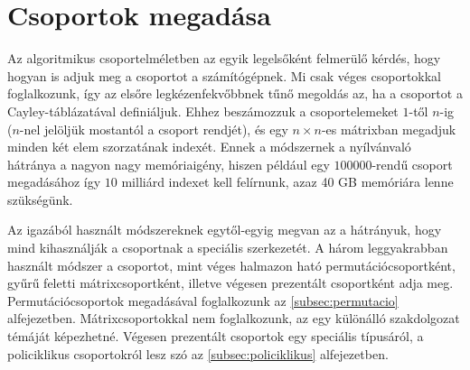 \section{Csoportok megadása}
\label{sec:csoport}
Az algoritmikus csoportelméletben az egyik legelsőként felmerülő kérdés, hogy hogyan is adjuk meg a csoportot a számítógépnek.
Mi csak véges csoportokkal foglalkozunk, így az elsőre legkézenfekvőbbnek tűnő megoldás az, ha a csoportot a Cayley-táblázatával definiáljuk.
Ehhez beszámozzuk a csoportelemeket $1$-től $n$-ig ($n$-nel jelöljük mostantól a csoport rendjét),
és egy $n\times n$-es mátrixban megadjuk minden két elem szorzatának indexét.
Ennek a módszernek a nyílvánvaló hátránya a nagyon nagy memóriaigény,
hiszen például egy $100000$-rendű csoport megadásához így $10$ milliárd indexet kell felírnunk, azaz 40 GB memóriára lenne szükségünk.

Az igazából használt módszereknek egytől-egyig megvan az a hátrányuk, hogy mind kihasználják a csoportnak a speciális szerkezetét.
A három leggyakrabban használt módszer a csoportot, mint véges halmazon ható permutációcsoportként, gyűrű feletti mátrixcsoportként, illetve végesen prezentált csoportként adja meg.
Permutációcsoportok megadásával foglalkozunk az \ref{subsec:permutacio} alfejezetben.
Mátrixcsoportokkal nem foglalkozunk, az egy különálló szakdolgozat témáját képezhetné.
Végesen prezentált csoportok egy speciális típusáról, a policiklikus csoportokról lesz szó az \ref{subsec:policiklikus} alfejezetben.




\clearpage
